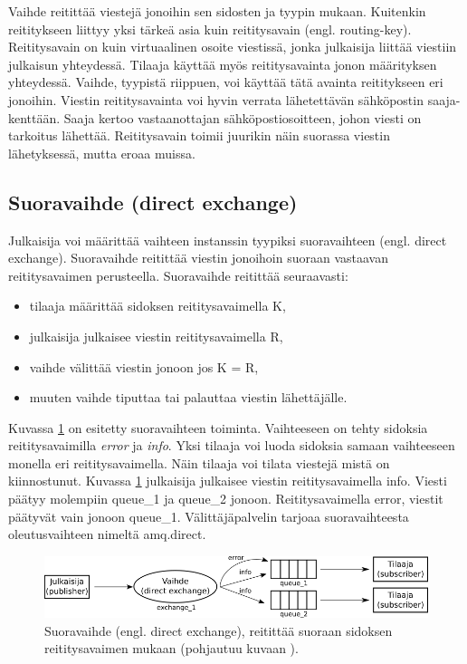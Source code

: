 Vaihde reitittää viestejä jonoihin sen sidosten ja tyypin mukaan. Kuitenkin reititykseen liittyy yksi tärkeä asia kuin reititysavain (engl. routing-key). Reititysavain on kuin virtuaalinen osoite viestissä, jonka julkaisija liittää viestiin julkaisun yhteydessä. Tilaaja käyttää myös reititysavainta jonon määrityksen yhteydessä. Vaihde, tyypistä riippuen, voi käyttää tätä avainta reititykseen eri jonoihin. Viestin reititysavainta voi hyvin verrata lähetettävän sähköpostin saaja-kenttään. Saaja kertoo vastaanottajan sähköpostiosoitteen, johon viesti on tarkoitus lähettää. Reititysavain toimii juurikin näin suorassa viestin lähetyksessä, mutta eroaa muissa.


\subsection{Suoravaihde (direct exchange)}
Julkaisija voi määrittää vaihteen instanssin tyypiksi suoravaihteen (engl. direct exchange). Suoravaihde reitittää viestin jonoihoin suoraan vastaavan reititysavaimen perusteella. Suoravaihde reitittää seuraavasti:
\begin{itemize}
	\item tilaaja määrittää sidoksen reititysavaimella K,
	\item julkaisija julkaisee viestin reititysavaimella R,
	\item vaihde välittää viestin jonoon jos K = R,
	\item muuten vaihde tiputtaa tai palauttaa viestin lähettäjälle.
\end{itemize}
Kuvassa \ref{fig:amqp-direct-exchange} on esitetty suoravaihteen toiminta. Vaihteeseen on tehty sidoksia reititysavaimilla \emph{error} ja \emph{info}. Yksi tilaaja voi luoda sidoksia samaan vaihteeseen monella eri reititysavaimella. Näin tilaaja voi tilata viestejä mistä on kiinnostunut. Kuvassa \ref{fig:amqp-direct-exchange} julkaisija julkaisee viestin reititysavaimella info. Viesti päätyy molempiin queue\_1 ja queue\_2 jonoon. Reititysavaimella error, viestit päätyvät vain jonoon queue\_1. Välittäjäpalvelin tarjoaa suoravaihteesta oleutusvaihteen nimeltä amq.direct. \cite[s.~27]{AMQP-specification}

\begin{figure}[ht!]
	\includegraphics[width=1\textwidth]{pictures/amqp-direct-exchange.png}
	\caption{Suoravaihde (engl. direct exchange), reitittää suoraan sidoksen reititysavaimen mukaan (pohjautuu kuvaan \cite{RabbitMQ-Tutorial-Routing}).}
	\label{fig:amqp-direct-exchange}
\end{figure}


